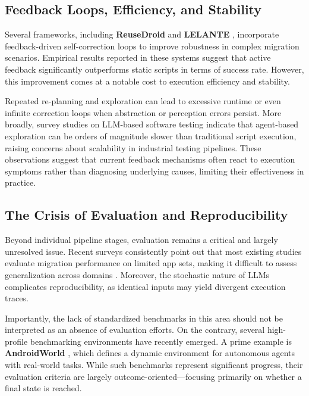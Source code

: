 \documentclass[acmsmall,nonacm]{acmart}
\begin{document}
\subsection{Feedback Loops, Efficiency, and Stability}
Several frameworks, including \textbf{ReuseDroid} and \textbf{LELANTE} \cite{fatin2025lelanteleveragingllmautomated}, incorporate feedback-driven self-correction loops to improve robustness in complex migration scenarios. Empirical results reported in these systems suggest that active feedback significantly outperforms static scripts in terms of success rate. However, this improvement comes at a notable cost to execution efficiency and stability.

Repeated re-planning and exploration can lead to excessive runtime or even infinite correction loops when abstraction or perception errors persist. More broadly, survey studies on LLM-based software testing indicate that agent-based exploration can be orders of magnitude slower than traditional script execution, raising concerns about scalability in industrial testing pipelines. These observations suggest that current feedback mechanisms often react to execution symptoms rather than diagnosing underlying causes, limiting their effectiveness in practice.

\subsection{The Crisis of Evaluation and Reproducibility}
Beyond individual pipeline stages, evaluation remains a critical and largely unresolved issue. Recent surveys consistently point out that most existing studies evaluate migration performance on limited app sets, making it difficult to assess generalization across domains \cite{wang2024softwaretestinglargelanguage,zhang2024surveylargelanguagemodels}. Moreover, the stochastic nature of LLMs complicates reproducibility, as identical inputs may yield divergent execution traces.

Importantly, the lack of standardized benchmarks in this area should not be interpreted as an absence of evaluation efforts. On the contrary, several high-profile benchmarking environments have recently emerged. A prime example is \textbf{AndroidWorld} \cite{rawles2025androidworlddynamicbenchmarkingenvironment}, which defines a dynamic environment for autonomous agents with real-world tasks. While such benchmarks represent significant progress, their evaluation criteria are largely outcome-oriented—focusing primarily on whether a final state is reached.
\end{document}
